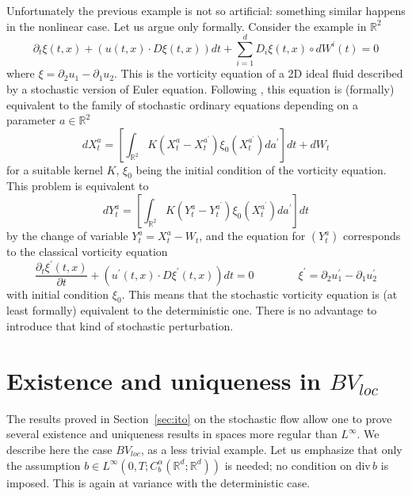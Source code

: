 \documentclass[a4paper,11pt]{article}
\begin{document}
Unfortunately the previous example is not so artificial: something similar
happens in the nonlinear case. Let us argue only formally. Consider the
example in $\mathbb{R}^{2}$%
\begin{equation*}
\partial _{t}\xi \left( t,x\right) +\left( u\left( t,x\right) \cdot D\xi
\left( t,x\right) \right) dt+\sum_{i=1}^{d}D_{i}\xi \left( t,x\right) \circ
dW^{i}\left( t\right) =0
\end{equation*}
where $\xi =\partial _{2}u_{1}-\partial _{1}u_{2}$. This is the vorticity
equation of a 2D ideal fluid described by a stochastic version of Euler
equation. Following \cite{MajBar}, this equation is (formally) equivalent to
the family of stochastic ordinary equations depending on a parameter $a\in
\mathbb{R}^{2}$%
\begin{equation*}
dX_{t}^{a}=\left[ \int_{\mathbb{R}^{2}}K(X_{t}^{a}-X_{t}^{a^{\prime }})\xi
_{0}(X_{t}^{a^{\prime }})da^{\prime }\right] dt+dW_{t}
\end{equation*}
for a suitable kernel $K$, $\xi _{0}$ being the initial condition of the
vorticity equation. This problem is equivalent to
\begin{equation*}
dY_{t}^{a}=\left[ \int_{\mathbb{R}^{2}}K(Y_{t}^{a}-Y_{t}^{a^{\prime }})\xi
_{0}(X_{t}^{a^{\prime }})da^{\prime }\right] dt
\end{equation*}
by the change of variable $Y_{t}^{a}=X_{t}^{a}-W_{t}$, and the equation for $%
\left( Y_{t}^{a}\right) $ corresponds to the classical vorticity equation
\begin{equation*}
\frac{\partial _{t}\xi ^{\prime }\left( t,x\right) }{\partial t}+\left(
u^{\prime }\left( t,x\right) \cdot D\xi ^{\prime }\left( t,x\right) \right)
dt=0\qquad \qquad \xi ^{\prime }=\partial _{2}u_{1}^{\prime }-\partial
_{1}u_{2}^{\prime }
\end{equation*}
with initial condition $\xi _{0}$. This means that the stochastic vorticity
equation is (at least formally) equivalent to the deterministic one. There
is no advantage to introduce that kind of stochastic perturbation.

\appendix

\section{Existence and uniqueness in $BV_{loc}$}

\label{sec:bv} The results proved in Section~\ref{sec:ito} on the stochastic flow allow
one to prove several existence and uniqueness results in spaces more regular
than $L^{\infty }$. We describe here the case $BV_{loc}$, as a less trivial
example. Let us emphasize that only the assumption $b\in L^{\infty }\left(
0,T;C_{b}^{\alpha }({\mathbb{R}}^{d};{\mathbb{R}}^{d})\right) $ is needed;
no condition on $\mathrm{div}\,b$ is imposed. This is again at variance with
the deterministic case.
\end{document}

